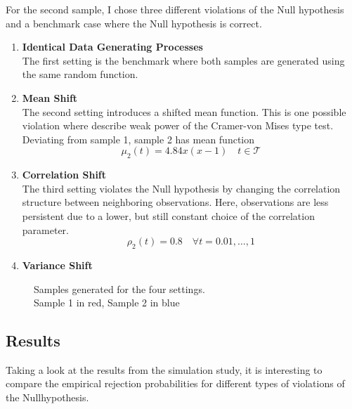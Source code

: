 \documentclass[12pt, a4paper]{article}
\theoremstyle{MAstyle} \newtheorem{assumption}{Assumption}[section]
\theoremstyle{MAstyle} \newtheorem{definition}{Definition}[section]
\begin{document}
		For the second sample, I chose three different violations of the Null hypothesis and a benchmark case where the Null hypothesis is correct.
		\begin{enumerate}
			\item \textbf{Identical Data Generating Processes}\\
				  The first setting is the benchmark where both samples are generated using the same random function.
			\item \textbf{Mean Shift}\\
				  The second setting introduces a shifted mean function. This is one possible violation where \cite{bugni_permutation_2021} describe weak power of the Cramer-von Mises type test. Deviating from sample 1, sample 2 has mean function 
				  $$\mu_2(t) = 4.84 x (x-1) \quad t \in \mathcal{T}$$
			\item \textbf{Correlation Shift}\\
			 	  The third setting violates the Null hypothesis by changing the correlation structure between neighboring observations. Here, observations are less persistent due to a lower, but still constant choice of the correlation parameter.
			 	  $$\rho_2(t) = 0.8 \quad \forall t = 0.01, \dots, 1$$
			\item \textbf{Variance Shift}\\
		\end{enumerate}
	
		\begin{figure}[H]
			\caption{Samples generated for the four settings. \\
			Sample 1 in red, Sample 2 in blue}
			\label{settings}
		\end{figure}
		
		\subsection{Results}
		Taking a look at the results from the simulation study, it is interesting to compare the empirical rejection probabilities for different types of violations of the Nullhypothesis.
		
\end{document}
